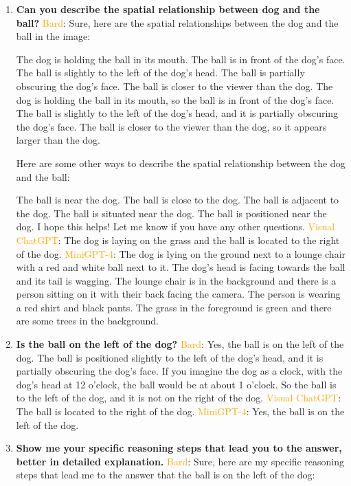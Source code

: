     \begin{enumerate}
        \item \textbf{Can you describe the spatial relationship between dog and the ball?}
        \subitem \textcolor{orange}{Bard}: 
        Sure, here are the spatial relationships between the dog and the ball in the image:
        
        The dog is holding the ball in its mouth.
        The ball is in front of the dog's face.
        The ball is slightly to the left of the dog's head.
        The ball is partially obscuring the dog's face.
        The ball is closer to the viewer than the dog.
        The dog is holding the ball in its mouth, so the ball is in front of the dog's face. The ball is slightly to the left of the dog's head, and it is partially obscuring the dog's face. The ball is closer to the viewer than the dog, so it appears larger than the dog.
        
        Here are some other ways to describe the spatial relationship between the dog and the ball:
        
        The ball is near the dog.
        The ball is close to the dog.
        The ball is adjacent to the dog.
        The ball is situated near the dog.
        The ball is positioned near the dog.
        I hope this helps! Let me know if you have any other questions.
        \subitem \textcolor{orange}{Visual ChatGPT}: The dog is laying on the grass and the ball is located to the right of the dog.
        \subitem \textcolor{orange}{MiniGPT-4}: The dog is lying on the ground next to a lounge chair with a red and white ball next to it. The dog’s head is facing towards the ball and its tail is wagging. The lounge chair is in the background and there is a person sitting on it with their back facing the camera. The person is wearing a red shirt and black pants. The grass in the foreground is green and there are some trees in the background.
        \item \textbf{Is the ball on the left of the dog?}
        \subitem \textcolor{orange}{Bard}: 
        Yes, the ball is on the left of the dog. The ball is positioned slightly to the left of the dog's head, and it is partially obscuring the dog's face. If you imagine the dog as a clock, with the dog's head at 12 o'clock, the ball would be at about 1 o'clock. So the ball is to the left of the dog, and it is not on the right of the dog.
        \subitem \textcolor{orange}{Visual ChatGPT}: The ball is located to the right of the dog.
        \subitem \textcolor{orange}{MiniGPT-4}: Yes, the ball is on the left of the dog.
        \item \textbf{Show me your specific reasoning steps that lead you to the answer, better in detailed explanation.}
        \subitem \textcolor{orange}{Bard}: 
        Sure, here are my specific reasoning steps that lead me to the answer that the ball is on the left of the dog:
        

\end{enumerate}
